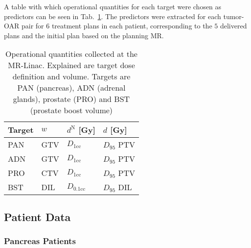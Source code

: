 \documentclass[\relativeRoot/ada.tex]{subfiles}
\begin{document}
A table with which operational quantities for each target were chosen as predictors can be seen in Tab.~\ref{tab:operational_quantity}. The predictors were extracted for each tumor-OAR pair for $6$ treatment plans in each patient, corresponding to the $5$ delivered plans and the initial plan based on the planning MR.

\begin{table}[!htb]
    \centering
    \caption{Operational quantities collected at the MR-Linac. Explained are target dose definition and volume. Targets are PAN (pancreas), ADN (adrenal glands), prostate (PRO) and BST (prostate boost volume)}
    \begin{tabular}{l|lll}
    \toprule
        Target & $w$ & $d^{\text{N}}$ [Gy] & $d$ [Gy] \\
    \midrule
       PAN & GTV & $D_{1\text{cc}}$   & $D_{95}$ PTV \\
       ADN & GTV & $D_{1\text{cc}}$   & $D_{95}$ PTV \\
       PRO & CTV & $D_{1\text{cc}}$   & $D_{95}$ PTV \\
       BST & DIL & $D_{0.1\text{cc}}$ & $D_{95}$ DIL \\
     
    \bottomrule
    \end{tabular}
    \label{tab:operational_quantity}
\end{table}

\subsection{Patient Data}

\subsubsection{Pancreas Patients}
\end{document}
